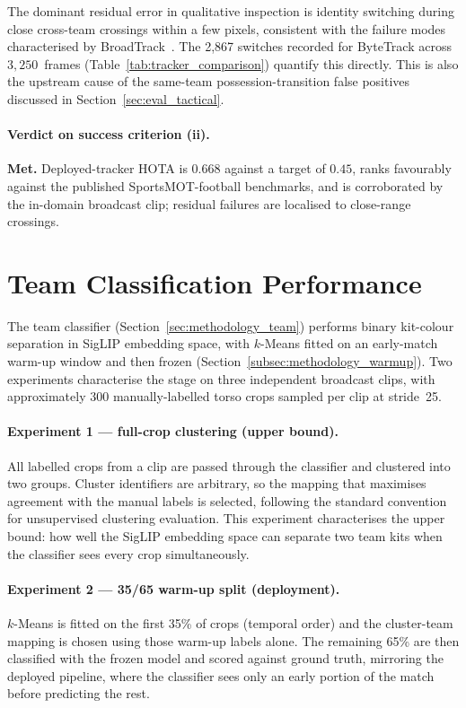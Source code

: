 The dominant residual error in qualitative inspection is identity
switching during close cross-team crossings within a few pixels,
consistent with the failure modes characterised by
BroadTrack~\cite{Magera2025}. The 2{,}867 switches recorded for ByteTrack
across $3{,}250$~frames (Table~\ref{tab:tracker_comparison})
quantify this directly. This is also the upstream cause of
the same-team possession-transition false positives discussed in
Section~\ref{sec:eval_tactical}.

\paragraph{Verdict on success criterion (ii).}
\textbf{Met.} Deployed-tracker HOTA is $0.668$ against a target of
$0.45$, ranks favourably against the published SportsMOT-football
benchmarks, and is corroborated by the in-domain broadcast clip;
residual failures are localised to close-range crossings.

\section{Team Classification Performance}
\label{sec:eval_team}

The team classifier (Section~\ref{sec:methodology_team}) performs
binary kit-colour separation in SigLIP embedding space, with $k$-Means
fitted on an early-match warm-up window and then frozen (Section~\ref{subsec:methodology_warmup}). Two
experiments characterise the stage on three independent broadcast
clips, with approximately 300 manually-labelled torso crops sampled
per clip at stride~25.

\paragraph{Experiment 1 — full-crop clustering (upper bound).}
All labelled crops from a clip are passed through the classifier and
clustered into two groups. Cluster identifiers are arbitrary, so the
mapping that maximises agreement with the manual labels is selected,
following the standard convention for unsupervised clustering
evaluation. This experiment characterises the upper bound: how well
the SigLIP embedding space can separate two team kits when the
classifier sees every crop simultaneously.

\paragraph{Experiment 2 — 35/65 warm-up split (deployment).}
$k$-Means is fitted on the first 35\% of crops (temporal order) and the
cluster-team mapping is chosen using those warm-up labels alone. The
remaining 65\% are then classified with the frozen model and scored
against ground truth, mirroring the deployed pipeline, where the classifier sees
only an early portion of the match before predicting the rest.

